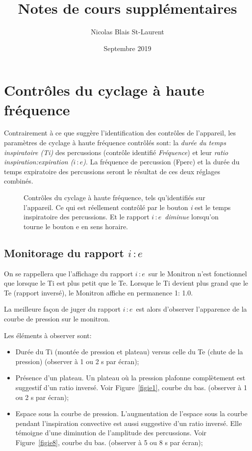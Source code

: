 \documentclass[letterpaper, titlepage]{article}
\title{Notes de cours supplémentaires}
\author{Nicolas Blais St-Laurent}
\date{Septembre 2019}
\def\ie{$i\, \colon e$}
\begin{document}


\tableofcontents
\section{Contrôles du cyclage à haute fréquence}

Contrairement à ce que suggère l'identification des contrôles de l'appareil, les
paramètres de cyclage à haute fréquence contrôlés sont: la \emph{durée du
temps inspiratoire (Ti)} des percussions (contrôle identifié
\emph{Fréquence}) et leur \emph{ratio inspiration\hspace{0.5em}:\hspace{0.3em}expiration (\ie)}. La
fréquence de percussion (Fperc) et la durée du temps expiratoire des
percussions seront le résultat de ces deux réglages combinés.

\begin{figure}[b]
	\centering
	
	\caption{Contrôles du cyclage à haute fréquence, tels qu'identifiés sur l'appareil. Ce qui est réellement contrôlé par le bouton {\em i} est le temps inspiratoire des percussions. Et le rapport \ie\ {\em diminue} lorsqu'on tourne le bouton e en sens horaire.}
\end{figure}



\subsection{Monitorage du rapport \ie}

On se rappellera que l'affichage du rapport \ie\ sur le Monitron n'est
fonctionnel que lorsque le Ti est plus petit que le Te. Lorsque le Ti
devient plus grand que le Te (rapport inversé), le Monitron affiche en
permanence 1\string: 1.0.

La meilleure façon de juger du rapport \ie\ est alors d'observer
l'apparence de la courbe de pression sur le monitron.

Les éléments à observer sont:

\begin{itemize}
\item
  Durée du Ti (montée de pression et plateau) versus celle du Te (chute
  de la pression) (observer à 1 ou 2 s par écran);
\item
  Présence d'un plateau. Un plateau où la pression plafonne complètement
		est suggestif d'un ratio inversé. Voir Figure~\ref{figie1}, courbe du bas.
  (observer à 1 ou 2 s par écran);
\item
  Espace sous la courbe de pression. L'augmentation de l'espace sous la
  courbe pendant l'inspiration convective est aussi suggestive d'un
  ratio inversé. Elle témoigne d'une diminution de l'amplitude des
  percussions. Voir Figure~\ref{figie8}, courbe du bas. (observer à 5 ou 8 s par
  écran);
\end{itemize}
\end{document}
